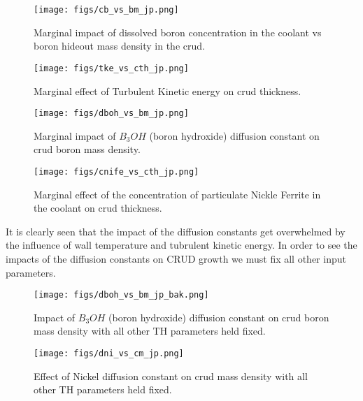\documentclass[10pt,a4paper]{report}
\begin{document}
\begin{figure}
    \centering
    \begin{minipage}{.5\textwidth}
        \centering
        \texttt{[image: figs/cb\_vs\_bm\_jp.png]}
        \caption{Marginal impact of dissolved boron concentration in the coolant vs boron hideout mass density in the crud.}
    \end{minipage}%
    \begin{minipage}{.5\textwidth}
        \centering
        \texttt{[image: figs/tke\_vs\_cth\_jp.png]}
        \caption{Marginal effect of Turbulent Kinetic energy on crud thickness.}
    \end{minipage}
\end{figure}

\begin{figure}
    \centering
    \begin{minipage}{.5\textwidth}
        \centering
        \texttt{[image: figs/dboh\_vs\_bm\_jp.png]}
        \caption{Marginal impact of $B_3OH$ (boron hydroxide) diffusion constant on crud boron mass density.}
    \end{minipage}%
    \begin{minipage}{.5\textwidth}
        \centering
        \texttt{[image: figs/cnife\_vs\_cth\_jp.png]}
        \caption{Marginal effect of the concentration of particulate Nickle Ferrite in the coolant on crud thickness.}
    \end{minipage}
\end{figure}

It is clearly seen that the impact of the diffusion constants get overwhelmed by the influence of wall temperature and tubrulent kinetic energy.  In order to see the impacts of the diffusion constants on CRUD growth we must fix all other input parameters.

\begin{figure}
    \centering
    \begin{minipage}{.5\textwidth}
        \centering
        \texttt{[image: figs/dboh\_vs\_bm\_jp\_bak.png]}
        \caption{Impact of $B_3OH$ (boron hydroxide) diffusion constant on crud boron mass density with all other TH parameters held fixed.}
    \end{minipage}%
    \begin{minipage}{.5\textwidth}
        \centering
        \texttt{[image: figs/dni\_vs\_cm\_jp.png]}
        \caption{Effect of Nickel diffusion constant on crud mass density with all other TH parameters held fixed.}
    \end{minipage}
\end{figure}
\end{document}
